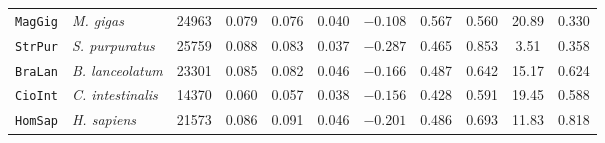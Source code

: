 \begin{table}[htbp]
\begin{tabular}{llrcccccccc}
    \texttt{MagGig} & \textit{M. gigas}        & \num{24963} & 0.079 & 0.076 & 0.040 & $-0.108$ & 0.567 & 0.560 & 20.89 & 0.330 \\
    \texttt{StrPur} & \textit{S. purpuratus}   & \num{25759} & 0.088 & 0.083 & 0.037 & $-0.287$ & 0.465 & 0.853 & 3.51  & 0.358 \\
    \texttt{BraLan} & \textit{B. lanceolatum}  & \num{23301} & 0.085 & 0.082 & 0.046 & $-0.166$ & 0.487 & 0.642 & 15.17 & 0.624 \\
    \texttt{CioInt} & \textit{C. intestinalis} & \num{14370} & 0.060 & 0.057 & 0.038 & $-0.156$ & 0.428 & 0.591 & 19.45 & 0.588 \\
    \texttt{HomSap} & \textit{H. sapiens}      & \num{21573} & 0.086 & 0.091 & 0.046 & $-0.201$ & 0.486 & 0.693 & 11.83 & 0.818 \\
    \bottomrule
    \end{tabular}
\end{table}


